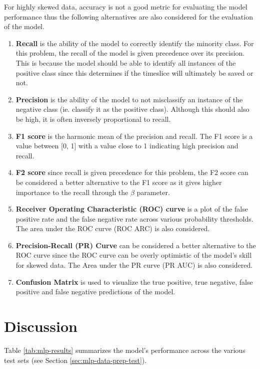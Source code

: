 For highly skewed data, accuracy is not a good metric for evaluating
the model performance \cite{branco2015survey} thus the following
alternatives are also considered for the evaluation of the model.

\begin{enumerate}
\item \textbf{Recall} is the ability of the model to correctly
  identify the minority class. For this problem, the recall of the
  model is given precedence over its precision. This is because the
  model should be able to identify all instances of the positive class
  since this determines if the timeslice will ultimately be saved or
  not.
\item \textbf{Precision} is the ability of the model to not
  misclassify an instance of the negative class (ie. classify it as
  the positive class). Although this should also be high, it is often
  inversely proportional to recall.
\item \textbf{F1 score} is the harmonic mean of the precision and
  recall. The F1 score is a value between [0, 1] with a value close to
  1 indicating high precision and recall.
\item \textbf{F2 score} since recall is given precedence for this
  problem, the F2 score can be considered a better alternative to the
  F1 score as it gives higher importance to the recall through the
  $\beta$ parameter.
\item \textbf{Receiver Operating Characteristic (ROC) curve} is a plot
  of the false positive rate and the false negative rate across
  various probability thresholds. The area under the ROC curve (ROC
  ARC) is also considered.
\item \textbf{Precision-Recall (PR) Curve} can be considered a better
  alternative to the ROC curve since the ROC curve can be overly
  optimistic of the model's skill for skewed data. The Area under the
  PR curve (PR AUC) is also considered.
\item \textbf{Confusion Matrix} is used to visualize the true
  positive, true negative, false positive and false negative
  predictions of the model.
\end{enumerate}

\section{Discussion}
\label{sec:mlp-disc}

Table \ref{tab:mlp-results} summarizes the model's performance across
the various test sets (see Section \ref{sec:mlp-data-prep-test}).

